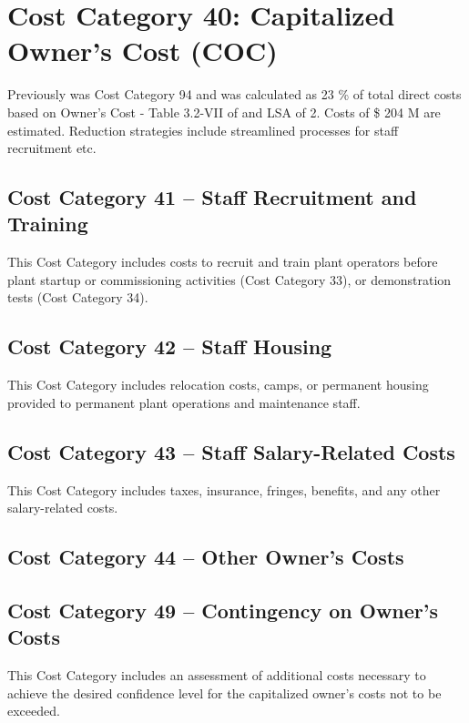 \section{Cost Category 40: Capitalized Owner’s Cost (COC)}

Previously was Cost Category 94 and was calculated as 23 \% of total direct costs based on Owner's Cost - Table 3.2-VII of \cite{SCH78} and LSA of 2. Costs of \$ 204 M are estimated. Reduction strategies include streamlined processes for staff recruitment etc. 

\subsection*{Cost Category 41 – Staff Recruitment and Training}
This Cost Category includes costs to recruit and train plant operators before plant startup or commissioning activities (Cost Category 33), or demonstration tests (Cost Category 34).

\subsection*{Cost Category 42 – Staff Housing}
This Cost Category includes relocation costs, camps, or permanent housing provided to permanent plant operations and maintenance staff.

\subsection*{Cost Category 43 – Staff Salary-Related Costs}
This Cost Category includes taxes, insurance, fringes, benefits, and any other salary-related costs.

\subsection*{Cost Category 44 – Other Owner’s Costs}

\subsection*{Cost Category 49 – Contingency on Owner’s Costs}
This Cost Category includes an assessment of additional costs necessary to achieve the desired confidence level for the capitalized owner’s costs not to be exceeded.
